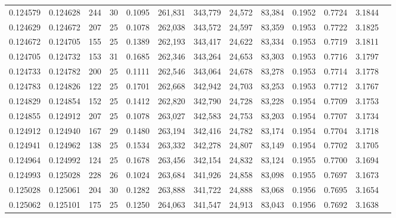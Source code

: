 \begin{tabular}{rrrrrrrrrrrrr}
0.124579 & 0.124628 & 244 &  30 &                                     0.1095 & 261,831 & 343,779 &  24,572 &  83,384 & 0.1952 & 0.7724 & 3.1844 \\
0.124629 & 0.124672 & 207 &  25 &                                     0.1078 & 262,038 & 343,572 &  24,597 &  83,359 & 0.1953 & 0.7722 & 3.1825 \\
0.124672 & 0.124705 & 155 &  25 &                                     0.1389 & 262,193 & 343,417 &  24,622 &  83,334 & 0.1953 & 0.7719 & 3.1811 \\
0.124705 & 0.124732 & 153 &  31 &                                     0.1685 & 262,346 & 343,264 &  24,653 &  83,303 & 0.1953 & 0.7716 & 3.1797 \\
0.124733 & 0.124782 & 200 &  25 &                                     0.1111 & 262,546 & 343,064 &  24,678 &  83,278 & 0.1953 & 0.7714 & 3.1778 \\
0.124783 & 0.124826 & 122 &  25 &                                     0.1701 & 262,668 & 342,942 &  24,703 &  83,253 & 0.1953 & 0.7712 & 3.1767 \\
0.124829 & 0.124854 & 152 &  25 &                                     0.1412 & 262,820 & 342,790 &  24,728 &  83,228 & 0.1954 & 0.7709 & 3.1753 \\
0.124855 & 0.124912 & 207 &  25 &                                     0.1078 & 263,027 & 342,583 &  24,753 &  83,203 & 0.1954 & 0.7707 & 3.1734 \\
0.124912 & 0.124940 & 167 &  29 &                                     0.1480 & 263,194 & 342,416 &  24,782 &  83,174 & 0.1954 & 0.7704 & 3.1718 \\
0.124941 & 0.124962 & 138 &  25 &                                     0.1534 & 263,332 & 342,278 &  24,807 &  83,149 & 0.1954 & 0.7702 & 3.1705 \\
0.124964 & 0.124992 & 124 &  25 &                                     0.1678 & 263,456 & 342,154 &  24,832 &  83,124 & 0.1955 & 0.7700 & 3.1694 \\
0.124993 & 0.125028 & 228 &  26 &                                     0.1024 & 263,684 & 341,926 &  24,858 &  83,098 & 0.1955 & 0.7697 & 3.1673 \\
0.125028 & 0.125061 & 204 &  30 &                                     0.1282 & 263,888 & 341,722 &  24,888 &  83,068 & 0.1956 & 0.7695 & 3.1654 \\
0.125062 & 0.125101 & 175 &  25 &                                     0.1250 & 264,063 & 341,547 &  24,913 &  83,043 & 0.1956 & 0.7692 & 3.1638 \\

\end{tabular}
